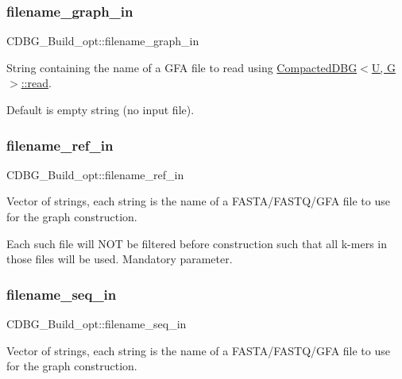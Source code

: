 \subsubsection{\texorpdfstring{filename\+\_\+graph\+\_\+in}{filename\_graph\_in}}
{\footnotesize\ttfamily C\+D\+B\+G\+\_\+\+Build\+\_\+opt\+::filename\+\_\+graph\+\_\+in}



String containing the name of a G\+FA file to read using \hyperlink{classCompactedDBG_a0930cb63a158caa70f4dcd425a088fb4}{Compacted\+D\+B\+G$<$\+U, G$>$\+::read}. 

Default is empty string (no input file). \mbox{\label{structCDBG__Build__opt_a4d0d3e899b64c6bbc9e5913375ba40e3}} 
\subsubsection{\texorpdfstring{filename\+\_\+ref\+\_\+in}{filename\_ref\_in}}
{\footnotesize\ttfamily C\+D\+B\+G\+\_\+\+Build\+\_\+opt\+::filename\+\_\+ref\+\_\+in}



Vector of strings, each string is the name of a F\+A\+S\+T\+A/\+F\+A\+S\+T\+Q/\+G\+FA file to use for the graph construction. 

Each such file will N\+OT be filtered before construction such that all k-\/mers in those files will be used. Mandatory parameter. \mbox{\label{structCDBG__Build__opt_abb43cea644ca04c5ed0c3034b03c70d4}} 
\subsubsection{\texorpdfstring{filename\+\_\+seq\+\_\+in}{filename\_seq\_in}}
{\footnotesize\ttfamily C\+D\+B\+G\+\_\+\+Build\+\_\+opt\+::filename\+\_\+seq\+\_\+in}



Vector of strings, each string is the name of a F\+A\+S\+T\+A/\+F\+A\+S\+T\+Q/\+G\+FA file to use for the graph construction. 

